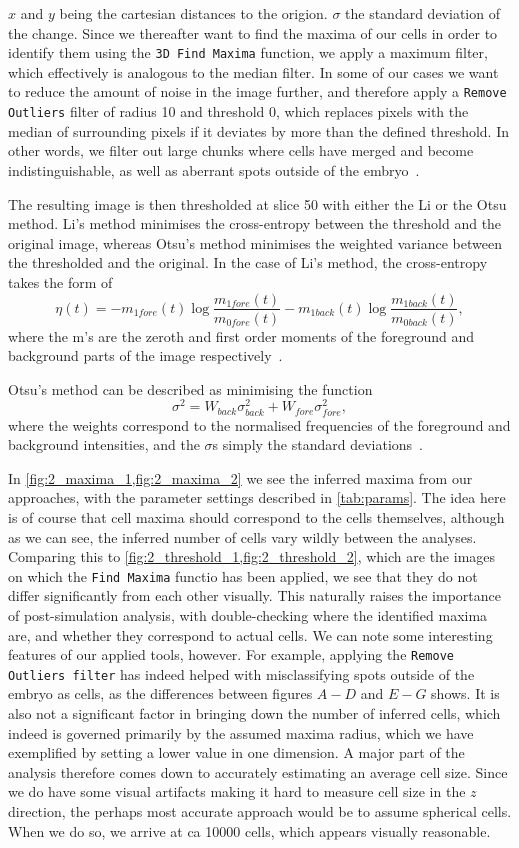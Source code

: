 \documentclass[10pt]{article}
\theoremstyle{plain}
\begin{document}
\begin{multicols*}{2}
$x$ and $y$ being the cartesian distances to the origion. $\sigma$ the standard deviation of the change. Since we thereafter want to find the maxima of our cells in order to identify them using the \texttt{3D Find Maxima} function, we apply a maximum filter, which effectively is analogous to the median filter. In some of our cases we want to reduce the amount of noise in the image further, and therefore apply a \texttt{Remove Outliers} filter of radius 10 and threshold 0, which replaces pixels with the median of surrounding pixels if it deviates by more than the defined threshold. In other words, we filter out large chunks where cells have merged and become indistinguishable, as well as aberrant spots outside of the embryo~\cite{imagej_methods}. 

The resulting image is then thresholded at slice 50 with either the Li or the Otsu method. Li's method minimises the cross-entropy between the threshold and the original image, whereas Otsu's method minimises the weighted variance between the thresholded and the original. In the case of Li's method, the cross-entropy takes the form of
$$ \eta(t) = -m_{1fore}(t)\log\dfrac{m_{1fore}(t)}{m_{0fore}(t)} -m_{1back}(t)\log\dfrac{m_{1back}(t)}{m_{0back}(t)},$$
where the m's are the zeroth and first order moments of the foreground and background parts of the image respectively~\cite{li}. 

Otsu's method can be described as minimising the function $$\sigma^2 = W_{back}\sigma_{back}^2 + W_{fore}\sigma_{fore}^2,$$ 
where the weights correspond to the normalised frequencies of the foreground and background intensities, and the $\sigma$s simply the standard deviations~\cite{otsu}. 


In \cref{fig:2_maxima_1,fig:2_maxima_2} we see the inferred maxima from our approaches, with the parameter settings described in \cref{tab:params}. The idea here is of course that cell maxima should correspond to the cells themselves, although as we can see, the inferred number of cells vary wildly between the analyses. Comparing this to \cref{fig:2_threshold_1,fig:2_threshold_2}, which are the images on which the \texttt{Find Maxima} functio has been applied, we see that they do not differ significantly from each other visually. This naturally raises the importance of post-simulation analysis, with double-checking where the identified maxima are, and whether they correspond to actual cells. We can note some interesting features of our applied tools, however. For example, applying the \texttt{Remove Outliers filter} has indeed helped with misclassifying spots outside of the embryo as cells, as the differences between figures $A-D$ and $E-G$ shows. It is also not a significant factor in bringing down the number of inferred cells, which indeed is governed primarily by the assumed maxima radius, which we have exemplified by setting a lower value in one dimension. A major part of the analysis therefore comes down to accurately estimating an average cell size. Since we do have some visual artifacts making it hard to measure cell size in the $z$ direction, the perhaps most accurate approach would be to assume spherical cells. When we do so, we arrive at ca 10000 cells, which appears visually reasonable.


\end{multicols*}
\end{document}
